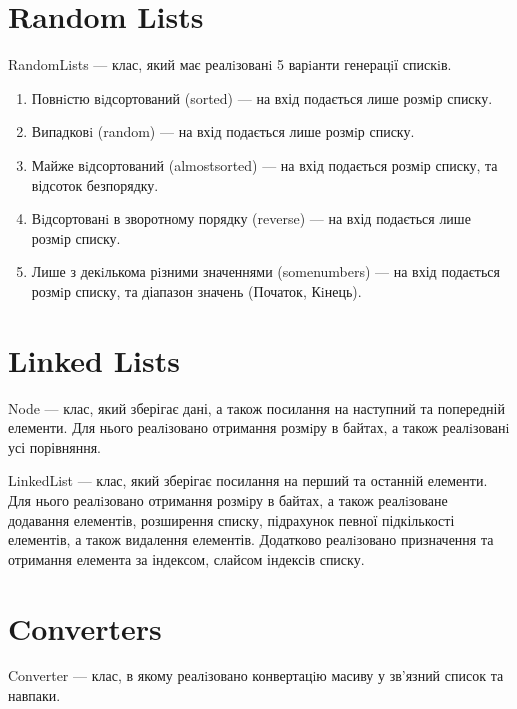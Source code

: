 \documentclass{article}
\begin{document}
    \section{Random Lists}
    RandomLists --- клас, який має реалiзованi 5 варiанти генерацiї спискiв.
    \begin{enumerate}
        \item Повнiстю вiдсортований (sorted) --- на вхід подається лише розмiр списку.
        \item Випадковi (random) --- на вхід подається лише розмiр списку.
        \item Майже вiдсортований (almostsorted) --- на вхід подається розмiр списку, та відсоток безпорядку.
        \item Вiдсортованi в зворотному порядку (reverse) --- на вхід подається лише розмiр списку.
        \item Лише з декiлькома рiзними значеннями (somenumbers) --- на вхід подається розмiр списку, та діапазон значень (Початок, Кiнець).
    \end{enumerate}
    \section{Linked Lists}  

        \indent Node --- клас, який зберігає дані, а також посилання на наступний та попередній елементи.
        Для нього реалiзовано отримання розмiру в байтах, а також реалiзованi усі порівняння.

        LinkedList --- клас, який зберігає посилання на перший та останній елементи.
        Для нього реалiзовано отримання розмiру в байтах, а також реалiзоване
        додавання елементів, розширення списку, підрахунок певної підкількості елементів, а також видалення елементів.
        \newline
        \indent Додатково реалiзовано призначення та отримання елемента за індексом, слайсом індексів списку.
    \section{Converters}
    Converter --- клас, в якому реалiзовано конвертацiю масиву у зв’язний список та навпаки.
\end{document}
